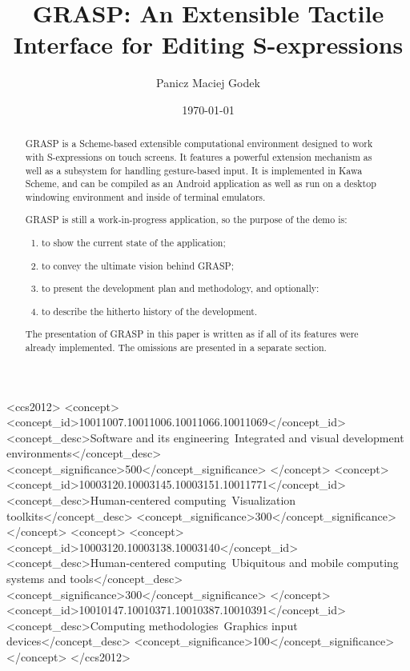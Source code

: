 \documentclass[sigconf]{acmart}
\date{\today}
\title{GRASP: An Extensible Tactile Interface for Editing S-expressions}
\begin{document}
\author{Panicz Maciej Godek}

\begin{abstract}

GRASP is a Scheme-based extensible computational environment
designed to work with S-expressions on touch screens. It features
a powerful extension mechanism as well as a subsystem for
handling gesture-based input. It is implemented in Kawa Scheme,
and can be compiled as an Android application as well as run
on a desktop windowing environment and inside of terminal
emulators.

GRASP is still a work-in-progress application, so the purpose
of the demo is:
\begin{enumerate}
\item to show the current state of the application;
\item to convey the ultimate vision behind GRASP;
\item to present the development plan and methodology, and optionally:
\item to describe the hitherto history of the development.
\end{enumerate}

The presentation of GRASP in this paper is written as if
all of its features were already implemented. The omissions
are presented in a separate section.

\end{abstract}


\begin{CCSXML}
  <ccs2012>
  <concept>
  <concept_id>10011007.10011006.10011066.10011069</concept_id>
  <concept_desc>Software and its engineering~Integrated and visual development environments</concept_desc>
  <concept_significance>500</concept_significance>
  </concept>
  <concept>
  <concept_id>10003120.10003145.10003151.10011771</concept_id>
  <concept_desc>Human-centered computing~Visualization toolkits</concept_desc>
  <concept_significance>300</concept_significance>
  </concept>
  <concept>
  <concept>
  <concept_id>10003120.10003138.10003140</concept_id>
  <concept_desc>Human-centered computing~Ubiquitous and mobile computing systems and tools</concept_desc>
  <concept_significance>300</concept_significance>
  </concept>
  <concept_id>10010147.10010371.10010387.10010391</concept_id>
  <concept_desc>Computing methodologies~Graphics input devices</concept_desc>
  <concept_significance>100</concept_significance>
  </concept>
  </ccs2012>
\end{CCSXML}
\end{document}
